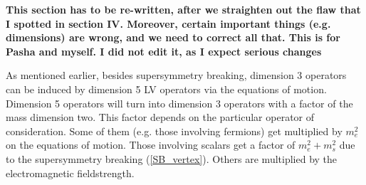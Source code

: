 \documentclass[12pt]{revtex4}
\begin{document}
{\bf This section has to be re-written, after we straighten out the 
flaw that I spotted in section IV. Moreover, certain important things (e.g. dimensions)
are wrong, and we need to correct all that. This is for Pasha and myself.
I did not edit it, as I expect serious changes}

As mentioned earlier, besides supersymmetry breaking, 
dimension 3 operators can be induced by dimension 5 LV 
operators via the equations of motion.
Dimension 5 operators will turn into dimension 3 operators 
with a factor of the mass dimension two.
This factor depends on the particular operator of consideration.
Some of them (e.g. those involving fermions) 
get multiplied by $ m_e^2 $ on the equations of motion.
Those involving scalars get a factor of
$ m_e^2 + m_s^2 $
due to the supersymmetry breaking (\ref{SB_vertex}).
Others are multiplied by the electromagnetic fieldstrength.

\end{document}
